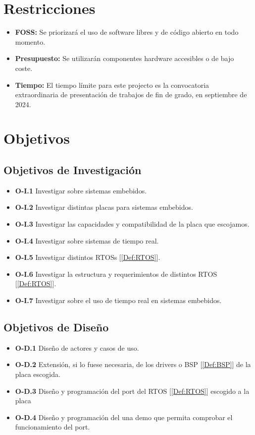 \section{Restricciones}
\begin{itemize}
    \item \textbf{FOSS:} Se priorizará el uso de software libres y de código abierto en todo momento.
    \item \textbf{Presupuesto:} Se utilizarán componentes hardware accesibles o de bajo coste.
    \item \textbf{Tiempo:} El tiempo límite para este projecto es la convocatoria extraordinaria de presentación de trabajos de fin de grado, en septiembre de 2024.
\end{itemize}

\section{Objetivos}
\subsection{Objetivos de Investigación}
\begin{itemize}
    \item \textbf{O-I.1} Investigar sobre sistemas embebidos.
    \item \textbf{O-I.2} Investigar distintas placas para sistemas embebidos.
    \item \textbf{O-I.3} Investigar las capacidades y compatibilidad de la placa que escojamos.
    \item \textbf{O-I.4} Investigar sobre sistemas de tiempo real.
    \item \textbf{O-I.5} Investigar distintos RTOSs [\ref{Def:RTOS}].
    \item \textbf{O-I.6} Investigar la estructura  y requerimientos de distintos RTOS [\ref{Def:RTOS}].
    \item \textbf{O-I.7} Investigar sobre el uso de tiempo real en sistemas embebidos.
\end{itemize}


\subsection{Objetivos de Diseño}
\begin{itemize}
    \item \textbf{O-D.1} Diseño de actores y casos de uso. %
    \item \textbf{O-D.2} Extensión, si lo fuese necesaria, de los drivers o BSP [\ref{Def:BSP}] de la placa escogida.
    \item \textbf{O-D.3} Diseño y programación del port del RTOS [\ref{Def:RTOS}] escogido a la placa
    \item \textbf{O-D.4} Diseño y programación del una demo que permita comprobar el funcionamiento del port.
\end{itemize}
